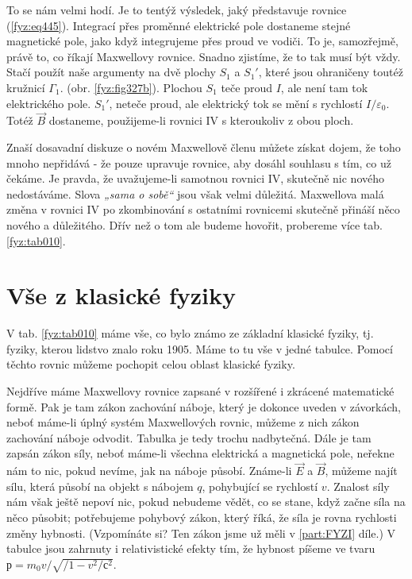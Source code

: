 {  To se nám velmi hodí. Je to tentýž výsledek, jaký představuje rovnice (\ref{fyz:eq445}). 
  Integrací přes proměnné elektrické pole dostaneme stejné magnetické pole, jako když integrujeme 
  přes proud ve vodiči. To je, samozřejmě, právě to, co říkají Maxwellovy rovnice. Snadno zjistíme, 
  že to tak musí být vždy. Stačí použít naše argumenty na dvě plochy \(S_1\) a \(S_1'\), které jsou 
  ohraničeny toutéž kružnicí \(\Gamma_1\). (obr. \ref{fyz:fig327b}). Plochou \(S_1\) teče proud 
  \(I\), ale není tam tok elektrického pole. \(S_1'\), neteče proud, ale elektrický tok se mění s 
  rychlostí \(I/\varepsilon_0\). Totéž \(\vec{B}\) dostaneme, použijeme-li rovnici IV s kteroukoliv 
  z obou ploch. 
  
  Znaší dosavadní diskuze o novém Maxwellově členu můžete získat dojem, že toho mnoho nepřidává - 
  že pouze upravuje rovnice, aby dosáhl souhlasu s tím, co už čekáme. Je pravda, že uvažujeme-li 
  samotnou rovnici IV, skutečně nic nového nedostáváme. Slova \emph{„sama o sobě“} jsou však velmi 
  důležitá. Maxwellova malá změna v rovnici IV po zkombinování s ostatními rovnicemi skutečně 
  přináší něco nového a důležitého. Dřív než o tom ale budeme hovořit, probereme více tab. 
  \ref{fyz:tab010}.
  
\section{Vše z klasické fyziky}\label{fyz:IIchapXVIIIsecII}
  V tab. \ref{fyz:tab010} máme vše, co bylo známo ze základní klasické fyziky, tj. fyziky, kterou 
  lidstvo znalo roku 1905. Máme to tu vše v jedné tabulce. Pomocí těchto rovnic můžeme pochopit 
  celou oblast klasické fyziky.
  
  Nejdříve máme Maxwellovy rovnice zapsané v rozšířené i zkrácené matematické formě. Pak je tam 
  zákon zachování náboje, který je dokonce uveden v závorkách, neboť máme-li úplný systém 
  Maxwellových rovnic, můžeme z nich zákon zachování náboje odvodit. Tabulka je tedy trochu 
  nadbytečná. Dále je tam zapsán zákon síly, neboť máme-li všechna elektrická a magnetická pole, 
  neřekne nám to nic, pokud nevíme, jak na náboje působí. Známe-li \(\vec{E}\) a \(\vec{B}\), 
  můžeme najít sílu, která působí na objekt s nábojem \(q\), pohybující se rychlostí \(v\). Znalost 
  síly nám však ještě nepoví nic, pokud nebudeme vědět, co se stane, když začne síla na něco 
  působit; potřebujeme pohybový zákon, který říká, že síla je rovna rychlosti změny hybnosti. 
  (Vzpomínáte si? Ten zákon jsme už měli v \ref{part:FYZI} díle.) V tabulce jsou zahrnuty i 
  relativistické efekty tím, že hybnost píšeme ve tvaru \(р = m_0v/\sqrt{/1 - v^2/с^2}\).
  
}
